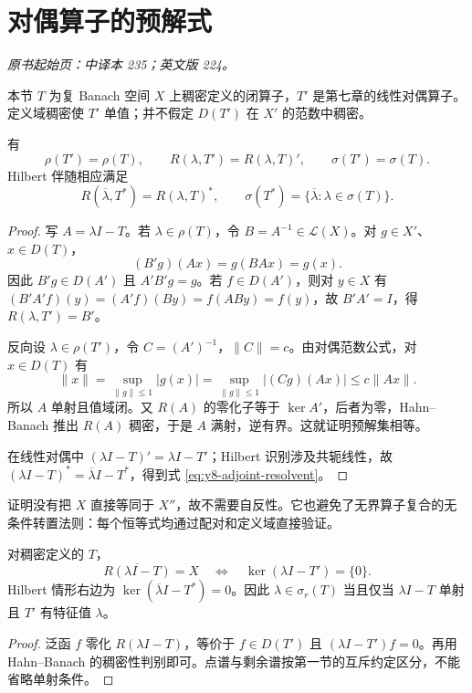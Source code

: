 \section{对偶算子的预解式}\label{sec:yosida-08-06}
\noindent\textit{原书起始页：中译本 235；英文版 224。}

本节 $T$ 为复 Banach 空间 $X$ 上稠密定义的闭算子，$T'$ 是第七章的线性对偶算子。定义域稠密使 $T'$ 单值；并不假定 $D(T')$ 在 $X'$ 的范数中稠密。

\begin{theorem}[对偶预解式与谱]\label{thm:y8-dual-resolvent}
有
\begin{equation}\label{eq:y8-dual-resolvent}
 \rho(T')=\rho(T),\qquad R(\lambda,T')=R(\lambda,T)',
 \qquad\sigma(T')=\sigma(T).
\end{equation}
Hilbert 伴随相应满足
\begin{equation}\label{eq:y8-adjoint-resolvent}
 R(\overline\lambda,T^*)=R(\lambda,T)^*,\qquad
 \sigma(T^*)=\{\overline\lambda:\lambda\in\sigma(T)\}.
\end{equation}
\end{theorem}
\begin{proof}
写 $A=\lambda I-T$。若 $\lambda\in\rho(T)$，令 $B=A^{-1}\in\mathcal L(X)$。对 $g\in X'$、$x\in D(T)$，
\[
 (B'g)(Ax)=g(BAx)=g(x).
\]
因此 $B'g\in D(A')$ 且 $A'B'g=g$。若 $f\in D(A')$，则对 $y\in X$ 有
$(B'A'f)(y)=(A'f)(By)=f(ABy)=f(y)$，故 $B'A'=I$，得 $R(\lambda,T')=B'$。

反向设 $\lambda\in\rho(T')$，令 $C=(A')^{-1}$，$\|C\|=c$。由对偶范数公式，对 $x\in D(T)$ 有
\[
 \|x\|=\sup_{\|g\|\le1}|g(x)|
 =\sup_{\|g\|\le1}|(Cg)(Ax)|\le c\|Ax\|.
\]
所以 $A$ 单射且值域闭。又 $R(A)$ 的零化子等于 $\ker A'$，后者为零，Hahn--Banach 推出 $R(A)$ 稠密，于是 $A$ 满射，逆有界。这就证明预解集相等。

在线性对偶中 $(\lambda I-T)'=\lambda I-T'$；Hilbert 识别涉及共轭线性，故 $(\lambda I-T)^*=\overline\lambda I-T^*$，得到式 \eqref{eq:y8-adjoint-resolvent}。
\end{proof}

证明没有把 $X$ 直接等同于 $X''$，故不需要自反性。它也避免了无界算子复合的无条件转置法则：每个恒等式均通过配对和定义域直接验证。

\begin{proposition}[剩余谱与伴随特征向量]
对稠密定义的 $T$，
\[
 \overline{R(\lambda I-T)}=X
 \quad\Longleftrightarrow\quad\ker(\lambda I-T')=\{0\}.
\]
Hilbert 情形右边为 $\ker(\overline\lambda I-T^*)=0$。因此 $\lambda\in\sigma_r(T)$ 当且仅当 $\lambda I-T$ 单射且 $T'$ 有特征值 $\lambda$。
\end{proposition}
\begin{proof}
泛函 $f$ 零化 $R(\lambda I-T)$，等价于 $f\in D(T')$ 且 $(\lambda I-T')f=0$。再用 Hahn--Banach 的稠密性判别即可。点谱与剩余谱按第一节的互斥约定区分，不能省略单射条件。
\end{proof}

